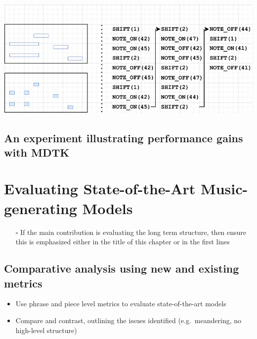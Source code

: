 \documentclass[12pt,a4paper,]{report}
\let\origfigure=\figure
\let\endorigfigure=\endfigure
\renewenvironment{figure}[1][]{%
\origfigure[b]
}{%
\endorigfigure
}
\providecommand{\tightlist}{%
  \setlength{\itemsep}{0pt}\setlength{\parskip}{0pt}}
\begin{document}
\begin{figure}[htbp]
\centering
\includegraphics[width=1.0\textwidth]{source/figures/dataformats.pdf}
\caption[Different data formats handled]{Data formats.}\label{fig:data_formats}
\end{figure}

\hypertarget{an-experiment-illustrating-performance-gains-with-mdtk}{%
\section{An experiment illustrating performance gains with
MDTK}\label{an-experiment-illustrating-performance-gains-with-mdtk}}

\hypertarget{evaluating-state-of-the-art-music-generating-models}{%
\chapter{Evaluating State-of-the-Art Music-generating
Models}\label{evaluating-state-of-the-art-music-generating-models}}

\begin{itemize}
\tightlist
\item[$\square$]
  If the main contribution is evaluating the long term structure, then
  ensure this is emphasized either in the title of this chapter or in
  the first lines
\end{itemize}

\hypertarget{comparative-analysis-using-new-and-existing-metrics}{%
\section{Comparative analysis using new and existing
metrics}\label{comparative-analysis-using-new-and-existing-metrics}}

\begin{itemize}
\tightlist
\item
  Use phrase and piece level metrics to evaluate state-of-the-art models
\item
  Compare and contrast, outlining the issues identified
  (e.g.~meandering, no high-level structure)
\end{itemize}
\end{document}
